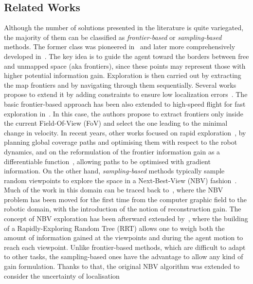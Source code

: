 \subsection{Related Works}%
\label{SEC:EXPLORATION-RELATED-WORKS}
Although the number of solutions presented in the literature is quite variegated, the majority of them can be classified as
\emph{frontier-based} or \emph{sampling-based} methods. The former class was pioneered in~\cite{yamauchi1997frontier} and
later more comprehensively developed in~\cite{julia2012comparison}. The key idea is to guide the agent toward the borders
between free and unmapped space (aka frontiers), since these points may represent those with higher potential information gain.
Exploration is then carried out by extracting the map frontiers and by navigating through them sequentially.
Several works propose to extend it by adding constraints to ensure low localization errors~\cite{stachniss2005information}.
The basic frontier-based approach has been also extended to high-speed flight for fast exploration in~\cite{cieslewski2017rapid}.
In this case, the authors propose to extract frontiers only inside the current Field-Of-View (FoV) and select the one leading
to the minimal change in velocity. In recent years, other works focused on rapid exploration~\cite{zhou2021fuel}, by planning
global coverage paths and optimising them with respect to the robot dynamics, and on the reformulation of the frontier information
gain as a differentiable function~\cite{deng2020robotic}, allowing paths to be optimised with gradient information. On the other hand,
\emph{sampling-based} methods typically sample random viewpoints to explore the space in a Next-Best-View (NBV)
fashion~\cite{connolly1985determination, maver1993occlusions}. Much of the work in this domain can be traced back
to~\cite{gonzalez2002navigation}, where the NBV problem has been moved for the first time from the computer graphic field to the
robotic domain, with the introduction of the notion of reconstruction gain. The concept of NBV exploration has been afterward extended
by~\cite{bircher2016receding}, where the building of a Rapidly-Exploring Random Tree (RRT) allows one to weigh both the amount of
information gained at the viewpoints and during the agent motion to reach each viewpoint. Unlike frontier-based methods, which
are difficult to adapt to other tasks, the sampling-based ones have the advantage to allow any kind of gain formulation.
Thanks to that, the original NBV algorithm was extended to consider the uncertainty of localisation~\cite{papachristos2017uncertainty, tovar2006planning}
